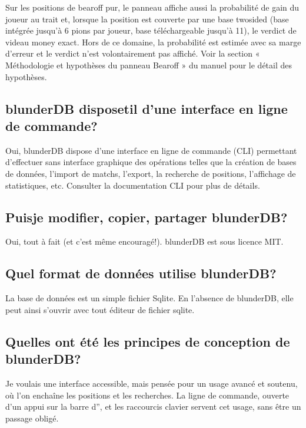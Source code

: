 \documentclass[letterpaper,10pt,french]{sphinxmanual}
\begin{document}
\sphinxAtStartPar
Sur les positions de bearoff pur, le panneau affiche aussi la probabilité de
gain du joueur au trait et, lorsque la position est couverte par une base
two\sphinxhyphen{}sided (base intégrée jusqu’à 6 pions par joueur, base téléchargeable
jusqu’à 11), le verdict de videau money exact. Hors de ce domaine, la
probabilité est estimée avec sa marge d’erreur et le verdict n’est
volontairement pas affiché. Voir la section « Méthodologie et hypothèses du
panneau Bearoff » du manuel pour le détail des hypothèses.


\subsection{blunderDB dispose\sphinxhyphen{}t\sphinxhyphen{}il d’une interface en ligne de commande?}
\label{\detokenize{faq:blunderdb-dispose-t-il-d-une-interface-en-ligne-de-commande}}
\sphinxAtStartPar
Oui, blunderDB dispose d’une interface en ligne de commande (CLI) permettant
d’effectuer sans interface graphique des opérations telles que la création de
bases de données, l’import de matchs, l’export, la recherche de positions,
l’affichage de statistiques, etc. Consulter la documentation CLI pour plus
de détails.


\subsection{Puis\sphinxhyphen{}je modifier, copier, partager blunderDB?}
\label{\detokenize{faq:puis-je-modifier-copier-partager-blunderdb}}
\sphinxAtStartPar
Oui, tout à fait (et c’est même encouragé!). blunderDB est sous licence MIT.


\subsection{Quel format de données utilise blunderDB?}
\label{\detokenize{faq:quel-format-de-donnees-utilise-blunderdb}}
\sphinxAtStartPar
La base de données est un simple fichier Sqlite. En l’absence de
blunderDB, elle peut ainsi s’ouvrir avec tout éditeur de fichier sqlite.


\subsection{Quelles ont été les principes de conception de blunderDB?}
\label{\detokenize{faq:quelles-ont-ete-les-principes-de-conception-de-blunderdb}}
\sphinxAtStartPar
Je voulais une interface accessible, mais pensée pour un usage avancé et
soutenu, où l’on enchaîne les positions et les recherches. La ligne de
commande, ouverte d’un appui sur la barre d”, et les raccourcis clavier
servent cet usage, sans être un passage obligé.
\end{document}
